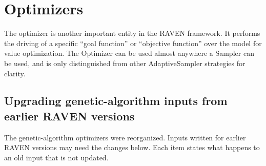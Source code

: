    \section{Optimizers} \label{sec:Optimizers} The optimizer is another important entity in the
  RAVEN framework. It performs the driving of a specific ``goal function'' or ``objective function''
  over the model for value optimization. The Optimizer can be used almost anywhere a Sampler can be
  used, and is only distinguished from other AdaptiveSampler strategies for clarity.
\subsection{Upgrading genetic-algorithm inputs from earlier RAVEN versions}
\label{subsec:gaMigration}
The genetic-algorithm optimizers were reorganized. Inputs written for earlier RAVEN versions may need
the changes below. Each item states what happens to an old input that is not updated.
